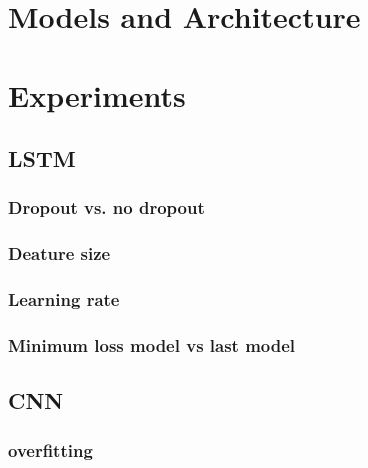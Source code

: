 \documentclass[a4paper]{article}
\begin{document}

\section{Models and Architecture}

\section{Experiments}

\subsection{LSTM}  %
\subsubsection{Dropout vs. no dropout} %
\subsubsection{Deature size} %
\subsubsection{Learning rate} %
\subsubsection{Minimum loss model vs last model} %

\subsection{CNN} %
\subsubsection{overfitting} %
\end{document}
